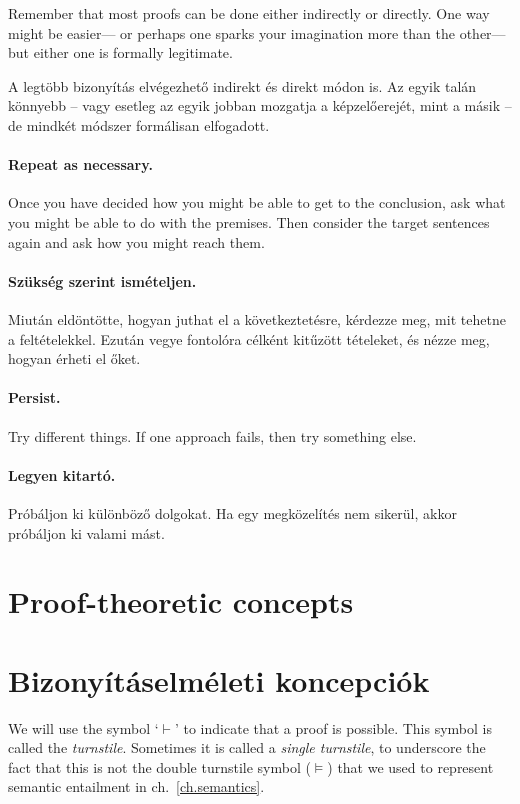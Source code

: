 Remember that most proofs can be done either indirectly or directly. One way might be easier--- or perhaps one sparks your imagination more than the other--- but either one is formally legitimate.

A legtöbb bizonyítás elvégezhető indirekt és direkt módon is. Az egyik talán könnyebb -- vagy esetleg az egyik jobban mozgatja a képzelőerejét, mint a másik -- de mindkét módszer formálisan elfogadott.

\paragraph{Repeat as necessary.} Once you have decided how you might be able to get to the conclusion, ask what you might be able to do with the premises. Then consider the target sentences again and ask how you might reach them.

\paragraph{Szükség szerint ismételjen.} Miután eldöntötte, hogyan juthat el a következtetésre, kérdezze meg, mit tehetne a feltételekkel. Ezután vegye fontolóra célként kitűzött tételeket, és nézze meg, hogyan érheti el őket.

\paragraph{Persist.}
Try different things. If one approach fails, then try something else.

\paragraph{Legyen kitartó.}
Próbáljon ki különböző dolgokat. Ha egy megközelítés nem sikerül, akkor próbáljon ki valami mást.



\section*{Proof-theoretic concepts}
\section{Bizonyításelméleti koncepciók}

We will use the symbol `$\vdash$' to indicate that a proof is possible. This symbol is called the \emph{turnstile}. Sometimes it is called a \emph{single turnstile}, to underscore the fact that this is not the {double turnstile} symbol ($\models$) that we used to represent semantic entailment in ch.~\ref{ch.semantics}.

